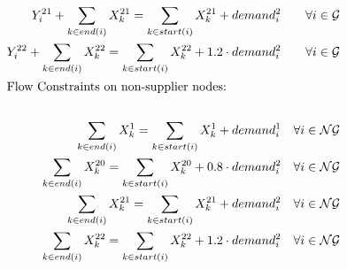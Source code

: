 \documentclass{article}
\begin{document}
\begin{align*}
		Y^{21}_i + \sum_{k \in end(i)} X^{21}_{k} =
		\sum_{k \in start(i)} X^{21}_{k} + demand^{2}_{i} &&\forall i\in \mathcal{G} \\
		Y^{22}_i + \sum_{k \in end(i)} X^{22}_{k} =
		\sum_{k \in start(i)} X^{22}_{k} + 1.2 \cdot demand^{2}_{i} &&\forall i\in \mathcal{G} \\
		\intertext{Flow Constraints on non-supplier nodes:}\\ 
		\sum_{k \in end(i)} X^{1}_{k} =
		\sum_{k \in start(i)} X^{1}_{k} + demand^{1}_{i} &&\forall i\in \mathcal{NG} \\
		\sum_{k \in end(i)} X^{20}_{k} =
		\sum_{k \in start(i)} X^{20}_{k} + 0.8 \cdot demand^{2}_{i} &&\forall i\in \mathcal{NG} \\
		\sum_{k \in end(i)} X^{21}_{k} =
		\sum_{k \in start(i)} X^{21}_{k} + demand^{2}_{i} &&\forall i\in \mathcal{NG} \\
		\sum_{k \in end(i)} X^{22}_{k} =
		\sum_{k \in start(i)} X^{22}_{k} + 1.2 \cdot demand^{2}_{i} &&\forall i\in \mathcal{NG} \\
	\end{align*}
\end{document}
